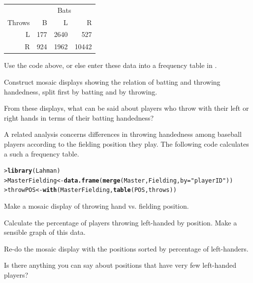 \documentclass[10pt,krantz2]{krantz}\usepackage[]{graphicx}\usepackage[]{color}
\makeatletter
\newcommand{\hlstr}[1]{\textcolor[rgb]{0.192,0.494,0.8}{#1}}%
\newcommand{\hlstd}[1]{\textcolor[rgb]{0.345,0.345,0.345}{#1}}%
\newcommand{\hlkwb}[1]{\textcolor[rgb]{0.69,0.353,0.396}{#1}}%
\newcommand{\hlkwc}[1]{\textcolor[rgb]{0.333,0.667,0.333}{#1}}%
\newcommand{\hlkwd}[1]{\textcolor[rgb]{0.737,0.353,0.396}{\textbf{#1}}}%
\newenvironment{kframe}{%
 \def\at@end@of@kframe{}%
 \ifinner\ifhmode%
  \def\at@end@of@kframe{\end{minipage}}%
  \begin{minipage}{\columnwidth}%
 \fi\fi%
 \def\FrameCommand##1{\hskip\@totalleftmargin \hskip-\fboxsep
 \colorbox{shadecolor}{##1}\hskip-\fboxsep
     \hskip-\linewidth \hskip-\@totalleftmargin \hskip\columnwidth}%
 \MakeFramed {\advance\hsize-\width
   \@totalleftmargin\z@ \linewidth\hsize
   \@setminipage}}%
 {\par\unskip\endMakeFramed%
 \at@end@of@kframe}
\newenvironment{knitrout}{}{} %
\renewenvironment{knitrout}{\small\renewcommand{\baselinestretch}{.85}}{} %
\makeatother
\begin{document}
\begin{Exercises}
\begin{table}[ht]
\centering
\begin{tabular}{r|rrr}
  \hline
       & \multicolumn{3}{c}{Bats} \\
Throws & B & L & R \\ 
  \hline
  L & 177 & 2640 & 527 \\ 
  R & 924 & 1962 & 10442 \\ 
   \hline
\end{tabular}
\end{table}
  \begin{itemize*}
    \item Use the code above, or else enter these data into a frequency table in \R.
    \item Construct mosaic displays showing the relation of batting and throwing handedness, split first by batting and by throwing.
    \item From these displays, what can be said about players who throw with their left
    or right hands in terms of their batting handedness? 
  \end{itemize*}

\exercise\hard
A related analysis concerns differences in throwing handedness among baseball players
according to the fielding position they play.  The following code calculates a
such a frequency table.

\begin{knitrout}
\color{fgcolor}\begin{kframe}
\begin{alltt}
\hlstd{> }\hlkwd{library}\hlstd{(Lahman)}
\hlstd{> }\hlstd{MasterFielding} \hlkwb{<-} \hlkwd{data.frame}\hlstd{(}\hlkwd{merge}\hlstd{(Master, Fielding,} \hlkwc{by} \hlstd{=} \hlstr{"playerID"}\hlstd{))}
\hlstd{> }\hlstd{throwPOS} \hlkwb{<-} \hlkwd{with}\hlstd{(MasterFielding,} \hlkwd{table}\hlstd{(POS, throws))}
\end{alltt}
\end{kframe}
\end{knitrout}
  \begin{enumerate*}
    \item Make a mosaic display of throwing hand vs. fielding position.
    \item Calculate the percentage of players throwing left-handed by position.
    Make a sensible graph of this data.
    \item Re-do the mosaic display with the positions sorted by percentage of left-handers.
    \item Is there anything you can say about positions that have very few left-handed
    players?
  \end{enumerate*}



\end{Exercises}
\end{document}
